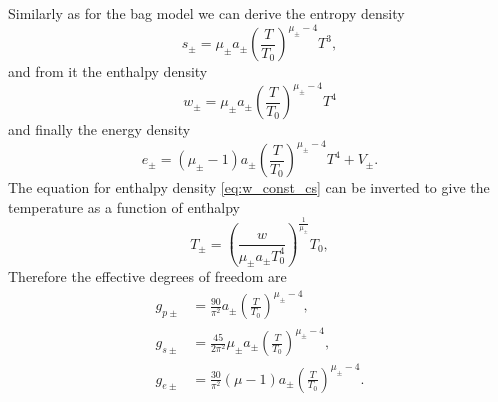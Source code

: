 Similarly as for the bag model we can derive the entropy density
\begin{equation}
s_\pm = \mu_\pm a_\pm \left( \frac{T}{T_0} \right)^{\mu_\pm - 4} T^3,
\end{equation}
and from it the enthalpy density
\begin{equation}
w_\pm = \mu_\pm a_\pm \left( \frac{T}{T_0} \right)^{\mu_\pm - 4} T^4
\label{eq:w_const_cs}
\end{equation}
and finally the energy density
\begin{equation}
e_\pm = (\mu_\pm - 1) a_\pm \left( \frac{T}{T_0} \right)^{\mu_\pm - 4} T^4 + V_\pm.
\end{equation}
The equation for enthalpy density \eqref{eq:w_const_cs} can be inverted to give the temperature as a function of enthalpy
\begin{equation}
T_\pm = \left( \frac{w}{\mu_\pm a_\pm T_0^4} \right)^\frac{1}{\mu_\pm} T_0,
\end{equation}
Therefore the effective degrees of freedom are
\begin{align}
g_{p\pm} &= \frac{90}{\pi^2} a_\pm \left( \frac{T}{T_0} \right)^{\mu_\pm - 4}, \\
g_{s\pm} &= \frac{45}{2\pi^2} \mu_\pm a_\pm \left( \frac{T}{T_0} \right)^{\mu_\pm - 4}, \\
g_{e\pm} &= \frac{30}{\pi^2} (\mu - 1) a_\pm \left( \frac{T}{T_0} \right)^{\mu_\pm - 4}.
\end{align}


